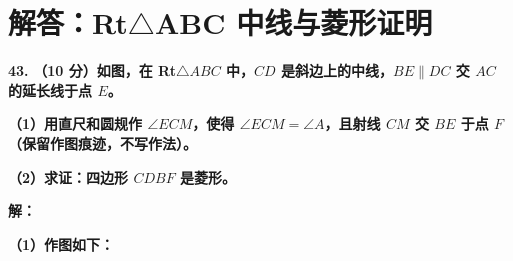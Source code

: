 \documentclass[12pt, a4paper]{ctexrep}
\begin{document}
\newpage

\section{解答：Rt$\triangle$ABC 中线与菱形证明}

\vspace{0.6cm}

\textbf{\LARGE 43.} \textbf{（10 分）如图，在 Rt$\triangle ABC$ 中，$CD$ 是斜边上的中线，$BE \parallel DC$ 交 $AC$ 的延长线于点 $E$。}

\textbf{（1）用直尺和圆规作 $\angle ECM$，使得 $\angle ECM = \angle A$，且射线 $CM$ 交 $BE$ 于点 $F$（保留作图痕迹，不写作法）。}

\textbf{（2）求证：四边形 $CDBF$ 是菱形。}

\vspace{0.4cm}
\textbf{解：}

\textbf{（1）作图如下：}
\end{document}
